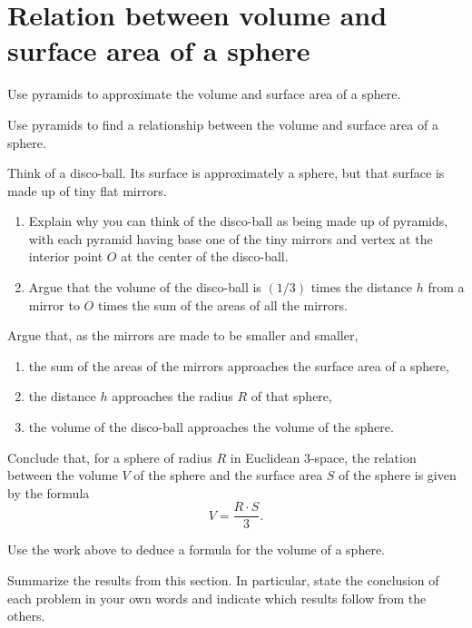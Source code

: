 \documentclass[newpage,hints,handout]{ximera}
\begin{document}
\section{Relation between volume and surface area of a sphere}
\begin{listOutcomes}
 \item Use pyramids to approximate the volume and surface area of a sphere.
 \item Use pyramids to find a relationship between the volume and surface area of a sphere.
\end{listOutcomes}
Think of a disco-ball. Its surface is approximately a sphere, but that
surface is made up of tiny flat mirrors.

\begin{problem}\hfil
\begin{enumerate}
\item Explain why you can think of the disco-ball as being made up of
  pyramids, with each pyramid having base one of the tiny mirrors and
  vertex at the interior point $O$ at the center of the disco-ball.
\item Argue that the volume of the disco-ball is $\left( 1/3\right) $
  times the distance $h$ from a mirror to $O$ times the sum of the
  areas of all the mirrors.
\end{enumerate}
\end{problem}

\begin{problem}
Argue that, as the mirrors are made to be smaller and smaller,
\begin{enumerate}
\item the sum of the areas of the mirrors approaches the surface area of a sphere,
\item the distance $h$ approaches the radius $R$ of that sphere,
\item the volume of the disco-ball approaches the volume of the sphere.
\end{enumerate}
Conclude that, for a sphere of radius $R$ in Euclidean $3$-space, the relation
between the volume $V$ of the sphere and the surface area $S$ of the sphere is
given by the formula%
\[
V=\frac{R\cdot S}{3}.
\]
\end{problem}

\begin{problem}
Use the work above to deduce a formula for the volume of a sphere.
\end{problem}




\begin{problem}
Summarize the results from this section. In particular, state the conclusion of each problem in your own words and indicate which
results follow from the others.
\begin{freeResponse}
\end{freeResponse}
\end{problem}
\end{document}
